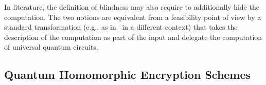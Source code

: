 \begin{remark} \label{rmk:blind-comp}
In literature, the definition of blindness may also require to additionally hide the computation. The two notions are equivalent from a feasibility point of view by a standard transformation (e.g., as in~\cite{GHRW14} in a different context) that takes the description of the computation as part of the input and delegate the computation of  universal quantum circuits.
\end{remark}





\subsection{Quantum Homomorphic Encryption Schemes}

